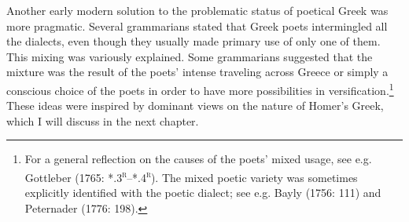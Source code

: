 \documentclass[12pt]{article}
\newenvironment{styleStandard}{\renewcommand\baselinestretch{1.25}\setlength\leftskip{0in}\setlength\rightskip{0in}\setlength\parindent{0.1972in}\setlength\parfillskip{0pt plus 1fil}\setlength\parskip{0in plus 1pt}\writerlistparindent\writerlistleftskip\leavevmode\normalfont\normalsize\writerlistlabel\ignorespaces}{\unskip\vspace{0in plus 1pt}\par}
\newcommand\writerlistleftskip{}
\newcommand\writerlistparindent{}
\newcommand\writerlistlabel{}
\begin{document}
\begin{styleStandard}
Another early modern solution to the problematic status of poetical Greek was more pragmatic. Several grammarians stated that Greek poets intermingled all the dialects, even though they usually made primary use of only one of them. This mixing was variously explained. Some grammarians suggested that the mixture was the result of the poets’ intense traveling across Greece or simply a conscious choice of the poets in order to have more possibilities in versification.\footnote{ For a general reflection on the causes of the poets’ mixed usage, see e.g. Gottleber (1765: *.3\textsc{\textsuperscript{r}}–*.4\textsc{\textsuperscript{r}}). The mixed poetic variety was sometimes explicitly identified with the poetic dialect; see e.g. Bayly (1756: 111) and Peternader (1776: 198).} These ideas were inspired by dominant views on the nature of Homer’s Greek, which I will discuss in the next chapter.
\end{styleStandard}
\end{document}
